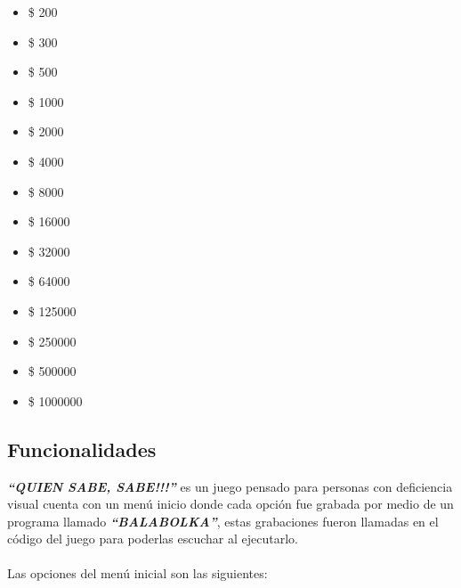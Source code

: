 \documentclass[a4paper,11pt]{article}
\begin{document}
{\begin{multicols}{2}
	\begin{itemize}
		\item \$ 200
		\item \$ 300
		\item \$ 500
		\item \$ 1000
		\item \$ 2000
		\item \$ 4000
		\item \$ 8000
		\item \$ 16000
		\item \$ 32000
		\item \$ 64000
		\item \$ 125000
		\item \$ 250000
		\item \$ 500000
		\item \$ 1000000
	\end{itemize}
\end{multicols}

\subsection{Funcionalidades}

\textbf{\textit{``QUIEN SABE, SABE!!!''}} es un juego pensado para personas con deficiencia visual cuenta con un men\'{u} inicio donde cada opci\'{o}n fue grabada por medio de un programa llamado \textbf{\textit{``BALABOLKA''}}, estas grabaciones fueron llamadas en el c\'{o}digo del juego para poderlas escuchar al ejecutarlo.\\ \\Las opciones del men\'{u} inicial son las siguientes: 

}
\end{document}
